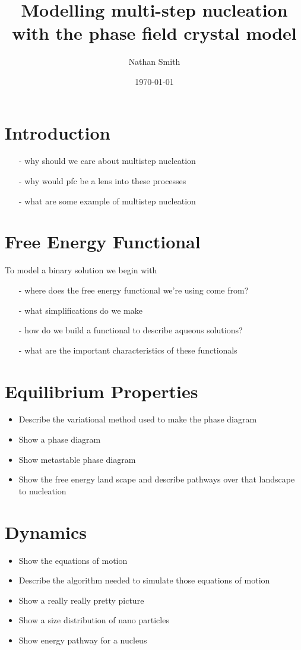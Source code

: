 \documentclass[11pt]{article}
\title{Modelling multi-step nucleation with the phase field crystal model}
\author{Nathan Smith}
\date{\today}
\begin{document}
\maketitle

\section{Introduction}

\begin{itemize}
 \item[-] why should we care about multistep nucleation
 \item[-] why would pfc be a lens into these processes
 \item[-] what are some example of multistep nucleation
\end{itemize} 
 
\section{Free Energy Functional}

To model a binary solution we begin with  


\begin{itemize}
 \item[-] where does the free energy functional we're using come from? 
 \item[-] what simplifications do we make 
 \item[-] how do we build a functional to describe aqueous solutions?
 \item[-] what are the important characteristics of these functionals
\end{itemize}

\section{Equilibrium Properties}

\begin{itemize}
\item Describe the variational method used to make the phase diagram
\item Show a phase diagram
\item Show metastable phase diagram
\item Show the free energy land scape and describe pathways over that landscape to nucleation
\end{itemize}

\section{Dynamics}

\begin{itemize}
\item Show the equations of motion
\item Describe the algorithm needed to simulate those equations of motion
\item Show a really really pretty picture
\item Show a size distribution of nano particles
\item Show energy pathway for a nucleus
\end{itemize}
\end{document}
